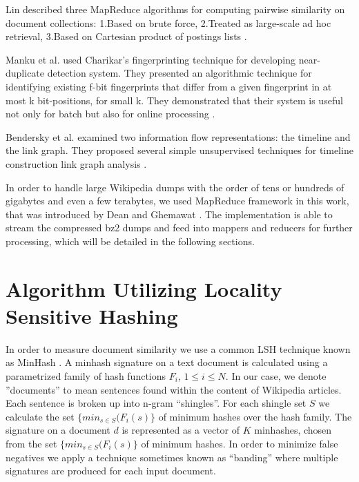 \documentclass{acm_proc_article-sp}
\begin{document}
Lin described three MapReduce algorithms for computing pairwise similarity on document collections: 1.Based on brute force, 2.Treated as large-scale ad hoc retrieval, 3.Based on Cartesian product of postings lists \cite{lin:brute}.

Manku et al. used Charikar's fingerprinting technique for developing near-duplicate detection system. They presented an algorithmic technique for identifying existing f-bit fingerprints that differ from a given fingerprint in at most k bit-positions, for small k. They demonstrated that their system is useful not only for batch but also for online processing \cite{manku:web}.

Bendersky et al. examined two information flow representations: the timeline and the link graph. They proposed several simple unsupervised techniques for timeline construction link graph analysis \cite{bendersky:timeline}.

In order to handle large Wikipedia dumps with the order of tens or hundreds of gigabytes and even a few terabytes, we used MapReduce framework in this work, that was introduced by Dean and Ghemawat \cite{dean:mapreduce}. The implementation is able to stream the compressed bz2 dumps and feed into mappers and reducers for further processing, which will be detailed in the following sections.

\section{Algorithm Utilizing Locality Sensitive Hashing}



In order to measure document similarity we use a common LSH technique known as MinHash \cite{}. A minhash signature on a text document is calculated using a parametrized family of hash functions $F_i$, $1 \le i \le N$. In our case, we denote ''documents'' to mean sentences found within the content of Wikipedia articles. Each sentence is broken up into n-gram ``shingles''. For each shingle set $S$ we calculate the set $\{min_{s \in S}(F_i(s)\}$ of minimum hashes over the hash family. The signature on a document $d$ is represented as a vector of $K$ minhashes, chosen from the set $\{min_{s \in S}(F_i(s)\}$ of minimum hashes. In order to minimize false negatives we apply a technique sometimes known as ``banding'' \cite{ullman:massive} where multiple signatures are produced for each input document.
\end{document}

